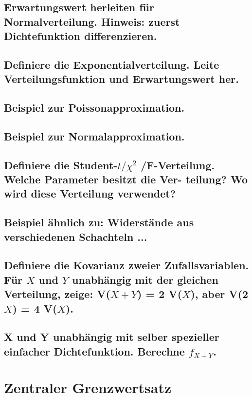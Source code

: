 \documentclass[a4paper,10pt]{article}
\begin{document}
\subsection{Erwartungswert herleiten für Normalverteilung. Hinweis: zuerst Dichtefunktion differenzieren.}

\subsection{Definiere die Exponentialverteilung. Leite Verteilungsfunktion und Erwartungswert her.}

\subsection{Beispiel zur Poissonapproximation.}

\subsection{Beispiel zur Normalapproximation.}

\subsection{Definiere die Student-$t /\chi^2$ /F-Verteilung. Welche Parameter besitzt die Ver-
teilung? Wo wird diese Verteilung verwendet?}

\subsection{Beispiel ähnlich zu: Widerstände aus verschiedenen Schachteln ...}

\subsection{Definiere die Kovarianz zweier Zufallsvariablen. Für $X$ und $Y$ unabhängig mit der gleichen Verteilung, zeige: V($X + Y$) = 2 V($X$),
aber V(2$X$) = 4 V($X$).}

\subsection{X und Y unabhängig mit selber spezieller einfacher Dichtefunktion. Berechne $f_{X + Y}$.}

\newpage
\section{Zentraler Grenzwertsatz}
\end{document}
